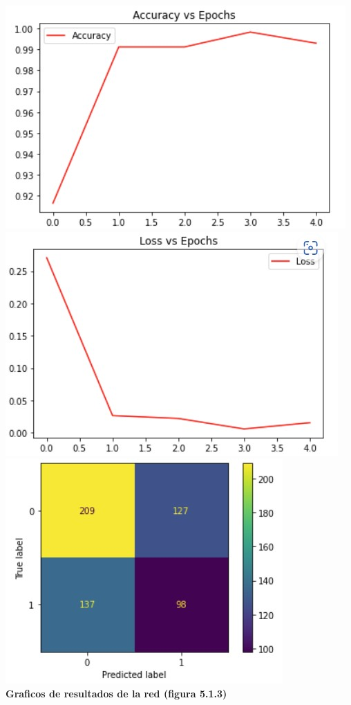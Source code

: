 \documentclass{article}
\begin{document}
        \begin{center}
                \includegraphics[scale=0.5]{images/accuracy_clasification.PNG.jpg} 
                \includegraphics[scale=0.5]{images/loss_clasification.jpg} \\

                \includegraphics[scale=0.7]{images/confution_matrix.PNG.jpg} \\

                \textbf{Graficos de resultados de la red (figura 5.1.3)}
                
        \end{center}
\end{document}
